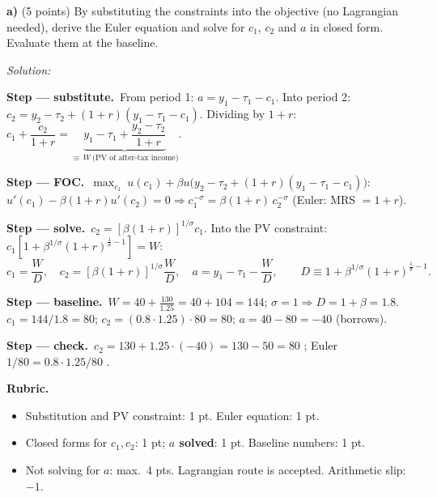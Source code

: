 \documentclass[11pt,a4paper]{article}
\newif\ifsolucoes
\newcommand{\answerheight}{5.2cm}
\newcommand{\answerspace}{\ifsolucoes\else\par\textit{Solution:}\vspace{\answerheight}\par\fi}
\newcommand{\step}[2]{\par\smallskip\noindent\textbf{Step --- #1.}~#2}
\newcommand{\rubric}[1]{\par\smallskip\noindent\textbf{Rubric.}\begin{itemize}[leftmargin=1.4em,topsep=1pt]#1\end{itemize}}
\newcommand{\res}[1]{\boxed{#1}}
\begin{document}
\textbf{a)} (5 points) By substituting the constraints into the objective (no Lagrangian needed), derive
the Euler equation and solve for $c_1$, $c_2$ and $a$ in closed form. Evaluate them at the baseline.
\answerspace
\begin{sol}
\step{substitute}{From period 1: $a=y_1-\tau_1-c_1$. Into period 2: $c_2=y_2-\tau_2+(1+r)(y_1-\tau_1-c_1)$.
Dividing by $1+r$: $c_1+\dfrac{c_2}{1+r}=\underbrace{y_1-\tau_1+\dfrac{y_2-\tau_2}{1+r}}_{\equiv\,W\ \text{(PV of after-tax income)}}$.}
\step{FOC}{$\max_{c_1}\ u(c_1)+\beta u\big(y_2-\tau_2+(1+r)(y_1-\tau_1-c_1)\big)$:\quad
$u'(c_1)-\beta(1+r)u'(c_2)=0\Rightarrow\res{c_1^{-\sigma}=\beta(1+r)\,c_2^{-\sigma}}$ (Euler: MRS $=1+r$).}
\step{solve}{$c_2=[\beta(1+r)]^{1/\sigma}c_1$. Into the PV constraint: $c_1\left[1+\beta^{1/\sigma}(1+r)^{\frac1\sigma-1}\right]=W$:
\[
\res{c_1=\frac{W}{D}},\quad \res{c_2=[\beta(1+r)]^{1/\sigma}\frac{W}{D}},\quad \res{a=y_1-\tau_1-\frac{W}{D}},\qquad
D\equiv1+\beta^{1/\sigma}(1+r)^{\frac1\sigma-1}.
\]}
\step{baseline}{$W=40+\frac{130}{1.25}=40+104=144$; $\sigma=1\Rightarrow D=1+\beta=1.8$.
$c_1=144/1.8=\res{80}$; $c_2=(0.8\cdot1.25)\cdot80=\res{80}$; $a=40-80=\res{-40}$ (borrows).}
\step{check}{$c_2=130+1.25\cdot(-40)=130-50=80$ \checkmark; Euler $1/80=0.8\cdot1.25/80$ \checkmark.}
\rubric{
\item Substitution and PV constraint: 1 pt. Euler equation: 1 pt.
\item Closed forms for $c_1,c_2$: 1 pt; \textbf{$a$ solved}: 1 pt. Baseline numbers: 1 pt.
\item Not solving for $a$: max.\ 4 pts. Lagrangian route is accepted. Arithmetic slip: $-1$.
}
\end{sol}
\end{document}
